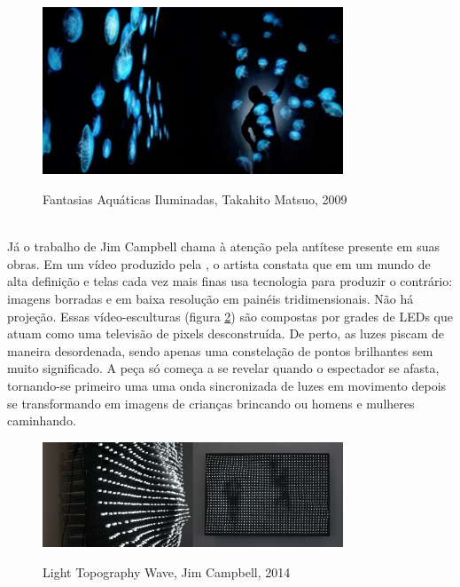 \begin{figure}[H]
    \centering
    \caption{Fantasias Aquáticas Iluminadas, Takahito Matsuo, 2009}
	\vspace*{0,2cm}
    \includegraphics[width=0.8\textwidth]{./04-figuras/takahito_matsuo}
    \label{fig:takahito_matsuo}
\end{figure}
\vspace*{-0,9cm}
{\raggedright {}}\\

Já o trabalho de Jim Campbell chama à atenção pela antítese presente em suas obras. Em um vídeo produzido pela , o artista constata que em um mundo de alta definição e telas cada vez mais finas usa tecnologia para produzir o contrário: imagens borradas e em baixa resolução em painéis tridimensionais. Não há projeção. Essas vídeo-esculturas (figura \ref{fig:jim_campbell}) são compostas por grades de LEDs que atuam como uma televisão de pixels desconstruída. De perto, as luzes piscam de maneira desordenada, sendo apenas uma constelação de pontos brilhantes sem muito significado. A peça só começa a se revelar quando o espectador se afasta, tornando-se primeiro uma uma onda sincronizada de luzes em movimento depois se transformando em imagens de crianças brincando ou homens e mulheres caminhando. 

\begin{figure}[H]
    \centering
    \caption{Light Topography Wave, Jim Campbell, 2014}
	\vspace*{0,2cm}
    \includegraphics[width=0.8\textwidth]{./04-figuras/jim_campbell}
    \label{fig:jim_campbell}
\end{figure}
\vspace*{-0,9cm}
{\raggedright {}}\\


